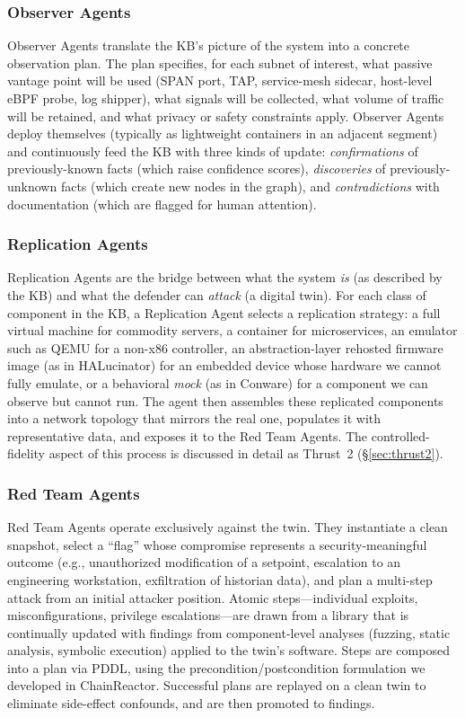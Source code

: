 \subsubsection{Observer Agents}
Observer Agents translate the KB's picture of the system into a
concrete observation plan. The plan specifies, for each subnet of
interest, what passive vantage point will be used (SPAN port, TAP,
service-mesh sidecar, host-level eBPF probe, log shipper), what
signals will be collected, what volume of traffic will be retained,
and what privacy or safety constraints apply. Observer Agents deploy
themselves (typically as lightweight containers in an adjacent
segment) and continuously feed the KB with three kinds of update:
\emph{confirmations} of previously-known facts (which raise confidence
scores), \emph{discoveries} of previously-unknown facts (which create
new nodes in the graph), and \emph{contradictions} with documentation
(which are flagged for human attention).

\subsubsection{Replication Agents}
Replication Agents are the bridge between what the system \emph{is}
(as described by the KB) and what the defender can \emph{attack} (a
digital twin). For each class of component in the KB, a Replication
Agent selects a replication strategy: a full virtual machine for
commodity servers, a container for microservices, an emulator such as
QEMU for a non-x86 controller, an abstraction-layer rehosted firmware
image (as in HALucinator) for an embedded device whose hardware we
cannot fully emulate, or a behavioral \emph{mock} (as in Conware) for
a component we can observe but cannot run. The agent then assembles
these replicated components into a network topology that mirrors the
real one, populates it with representative data, and exposes it to
the Red Team Agents. The controlled-fidelity aspect of this process is
discussed in detail as Thrust~2 (\S\ref{sec:thrust2}).

\subsubsection{Red Team Agents}
Red Team Agents operate exclusively against the twin. They instantiate
a clean snapshot, select a ``flag'' whose compromise represents a
security-meaningful outcome (e.g., unauthorized modification of a
setpoint, escalation to an engineering workstation, exfiltration of
historian data), and plan a multi-step attack from an initial attacker
position. Atomic steps---individual exploits, misconfigurations,
privilege escalations---are drawn from a library that is continually
updated with findings from component-level analyses (fuzzing, static
analysis, symbolic execution) applied to the twin's software. Steps
are composed into a plan via PDDL, using the precondition/postcondition
formulation we developed in ChainReactor. Successful plans are
replayed on a clean twin to eliminate side-effect confounds, and are
then promoted to findings.

